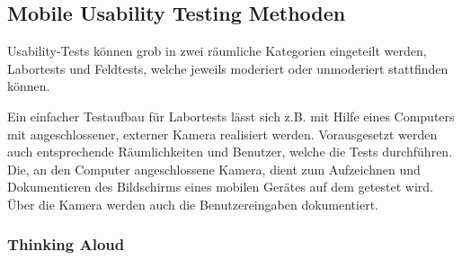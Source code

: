 \subsection{Mobile Usability Testing Methoden}
Usability-Tests können grob in zwei räumliche Kategorien eingeteilt werden, Labortests und Feldtests, welche jeweils moderiert oder unmoderiert stattfinden können.

Ein einfacher Testaufbau für Labortests lässt sich z.B. mit Hilfe eines Computers mit angeschlossener, externer Kamera realisiert werden. 
Vorausgesetzt werden auch entsprechende Räumlichkeiten und Benutzer, welche die Tests durchführen.
Die, an den Computer angeschlossene Kamera, dient zum Aufzeichnen und Dokumentieren des Bildschirms eines mobilen Gerätes auf dem getestet wird.
Über die Kamera werden auch die Benutzereingaben dokumentiert. \cite[Vgl.][]{Budiu.2014}

\subsubsection{Thinking Aloud\label{subsec:thinking_aloud}}